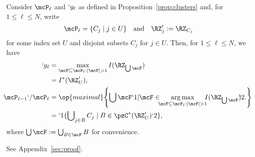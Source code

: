\begin{Theorem}
	\label{thm:`g:P:fused}
 Consider  $\mcP_{\ell}$ and $`g_\ell$ as defined in Proposition~\ref{prop:clusters} and, for $1\leq
 \ell\leq N$, write
 \begin{align}
 	\mcP_{\ell}=\Set{C_j\mid j\in U} \kern1em \text{and}\kern1em
 	\RZ'_j:=\RZ_{C_j} \label {eq:Z'}
 \end{align}
 for some index set $U$ and disjoint subsets $C_j$ for $j\in U$. Then, for $1\leq \ell \leq N$, we
 have
 \begin{subequations}[eq:A:`g]
 	\begin{align}
 	`g_\ell
	&=\max_{\mcF\subseteq \mcP_{\ell}:\abs{\mcF}>1} I(\RZ_{\bigcup \mcF}) \label{eq:A:`g_l}\\
 	&=I^*(\RZ'_U), %
 	\label{eq:A:`g_l:fused}\\
 	\nextParentEquation[eq:A:P]
 	\kern-.7em\mcP_{\ell-1}`/\mcP_{\ell}
 	&=\op{maximal}\Set*{\bigcup\mcF`1| \mcF\in\kern-.5em \argmax_{\mcF\subseteq \mcP_{\ell}:\abs{\mcF}>1} \kern-.5em I(\RZ_{\bigcup \mcF}) \kern-.3em `2.}\kern-.5em\label{eq:A:P_i-1}\\
 	&=`1\{\bigcup\nolimits_{j\in B}C_j \mid B\in \pzC^*(\RZ'_U)`2\}, \label{eq:A:P_i-1:fused}
 	\end{align}
 \end{subequations}
where $\bigcup \mcF:=\bigcup_{B\in \mcF} B$ for convenience.
\end{Theorem}
\begin{Proof}
	See Appendix~\ref{sec:proof}.
\end{Proof}
